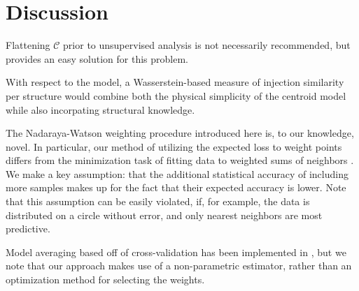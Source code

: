 

\section{Discussion}

Flattening $\mathcal C$ prior to unsupervised analysis is not necessarily recommended, but provides an easy solution for this problem.

With respect to the model, a Wasserstein-based measure of injection similarity per structure would combine both the physical simplicity of the centroid model while also incorpating structural knowledge.

The Nadaraya-Watson weighting procedure introduced here is, to our knowledge, novel.  In particular, our method of utilizing the expected loss to weight points differs from the minimization task of fitting data to weighted sums of neighbors \citep{Saul2003-th}.  We make a key assumption: that the additional statistical accuracy of including more samples makes up for the fact that their expected accuracy is lower. Note that this assumption can be easily violated, if, for example, the data is distributed on a circle without error, and only nearest neighbors are most predictive.

Model averaging based off of cross-validation has been implemented in \citet{Gao2016-qe}, but we note that our approach makes use of a non-parametric estimator, rather than an optimization method for selecting the weights.  










